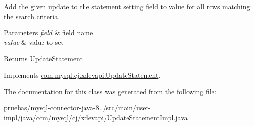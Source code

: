 Add the given update to the statement setting field to value for all rows matching the search criteria.


\begin{DoxyParams}{Parameters}
{\em field} & field name \\
\hline
{\em value} & value to set \\
\hline
\end{DoxyParams}
\begin{DoxyReturn}{Returns}
\mbox{\hyperlink{interfacecom_1_1mysql_1_1cj_1_1xdevapi_1_1_update_statement}{Update\+Statement}} 
\end{DoxyReturn}


Implements \mbox{\hyperlink{interfacecom_1_1mysql_1_1cj_1_1xdevapi_1_1_update_statement_a01e50a32f4bf89c98b112b7e22a6f140}{com.\+mysql.\+cj.\+xdevapi.\+Update\+Statement}}.



The documentation for this class was generated from the following file\+:\begin{DoxyCompactItemize}
\item 
pruebas/mysql-\/connector-\/java-\/8../src/main/user-\/impl/java/com/mysql/cj/xdevapi/\mbox{\hyperlink{_update_statement_impl_8java}{Update\+Statement\+Impl.\+java}}\end{DoxyCompactItemize}
